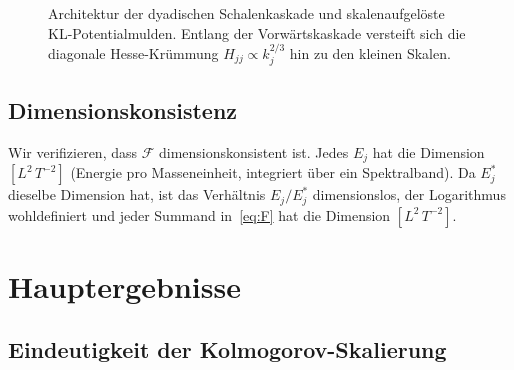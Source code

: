 \documentclass[12pt,a4paper]{article}
\theoremstyle{definition}
\theoremstyle{plain}
\theoremstyle{remark}
\begin{document}
\begin{figure}[htbp]
\caption{Architektur der dyadischen Schalenkaskade und skalenaufgelöste KL-Potentialmulden. Entlang der Vorwärtskaskade versteift sich die diagonale Hesse-Krümmung $H_{jj} \propto k_j^{2/3}$ hin zu den kleinen Skalen.}
\label{fig:cascade-architecture}\label{fig:kaskaden-architektur}
\end{figure}

\subsection{Dimensionskonsistenz}

Wir verifizieren, dass $\mathcal{F}$ dimensionskonsistent ist. Jedes $E_j$ hat die
Dimension $[L^2\,T^{-2}]$ (Energie pro Masseneinheit, integriert über ein
Spektralband). Da $E_j^*$ dieselbe Dimension hat, ist das Verhältnis
$E_j/E_j^*$ dimensionslos, der Logarithmus wohldefiniert und jeder
Summand in~\eqref{eq:F} hat die Dimension $[L^2\,T^{-2}]$.
\section{Hauptergebnisse}\label{sec:results}

\subsection{Eindeutigkeit der Kolmogorov-Skalierung}
\end{document}
